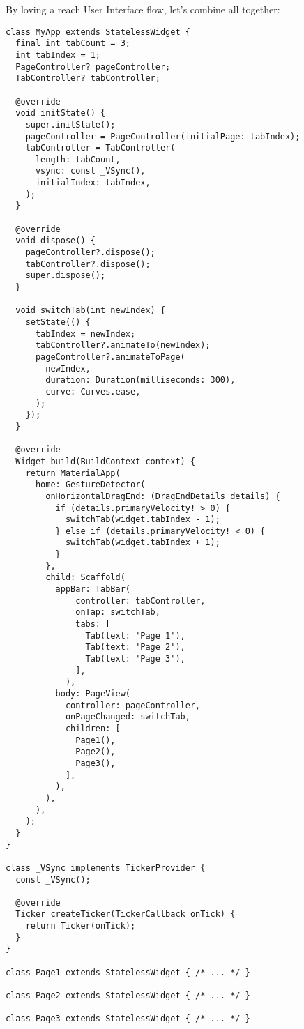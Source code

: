 By loving a reach User Interface flow, let's combine all together:

\begin{lstlisting}
class MyApp extends StatelessWidget {
  final int tabCount = 3;
  int tabIndex = 1;
  PageController? pageController;
  TabController? tabController;

  @override
  void initState() {
    super.initState();
    pageController = PageController(initialPage: tabIndex);
    tabController = TabController(
      length: tabCount,
      vsync: const _VSync(),
      initialIndex: tabIndex,
    );
  }

  @override
  void dispose() {
    pageController?.dispose();
    tabController?.dispose();
    super.dispose();
  }

  void switchTab(int newIndex) {
    setState(() {
      tabIndex = newIndex;
      tabController?.animateTo(newIndex);
      pageController?.animateToPage(
        newIndex,
        duration: Duration(milliseconds: 300),
        curve: Curves.ease,
      );
    });
  }

  @override
  Widget build(BuildContext context) {
    return MaterialApp(
      home: GestureDetector(
        onHorizontalDragEnd: (DragEndDetails details) {
          if (details.primaryVelocity! > 0) {
            switchTab(widget.tabIndex - 1);
          } else if (details.primaryVelocity! < 0) {
            switchTab(widget.tabIndex + 1);
          }
        },
        child: Scaffold(
          appBar: TabBar(
              controller: tabController,
              onTap: switchTab,
              tabs: [
                Tab(text: 'Page 1'),
                Tab(text: 'Page 2'),
                Tab(text: 'Page 3'),
              ],
            ),
          body: PageView(
            controller: pageController,
            onPageChanged: switchTab,
            children: [
              Page1(),
              Page2(),
              Page3(),
            ],
          ),
        ),
      ),
    );
  }
}

class _VSync implements TickerProvider {
  const _VSync();

  @override
  Ticker createTicker(TickerCallback onTick) {
    return Ticker(onTick);
  }
}

class Page1 extends StatelessWidget { /* ... */ }

class Page2 extends StatelessWidget { /* ... */ }

class Page3 extends StatelessWidget { /* ... */ }
\end{lstlisting}

